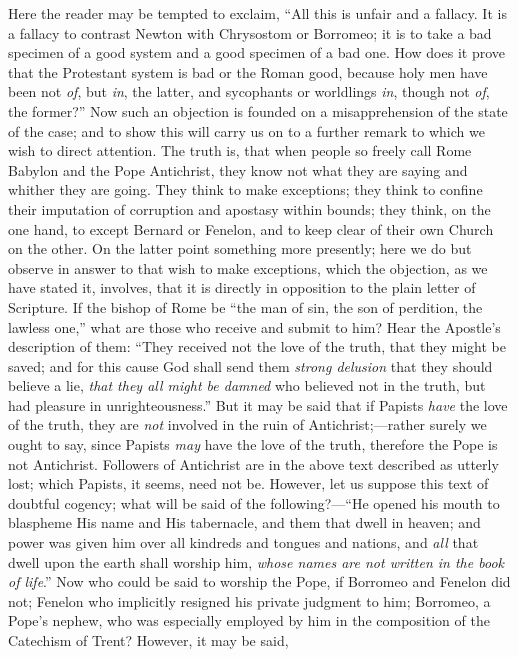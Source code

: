Here the reader may be tempted to exclaim, ``All this is unfair
and a fallacy. It is a fallacy to contrast Newton with Chrysostom or
Borromeo; it is to take a bad specimen of a good system and a good
specimen of a bad one. How does it prove that the Protestant
system is bad or the Roman good, because holy men have been not \emph{of},
but \emph{in}, the latter, and sycophants or worldlings \emph{in},
though not \emph{of}, the former?'' Now such an objection is
founded on a misapprehension of the state of the case; and to show
this will carry us on to a further remark to which we wish to direct
attention. The truth is, that when people so freely call Rome Babylon
and the Pope Antichrist, they know not what they are saying and
whither they are going. They think to make exceptions; they think to
confine their imputation of corruption and apostasy within bounds;
they think, on the one hand, to except Bernard or Fenelon, and to keep
clear of their own Church on the other. On the latter point something
more presently; here we do but observe in answer to that wish to make
exceptions, which the objection, as we have stated it, involves, that
it is directly in opposition to the plain letter of Scripture. If the
bishop of Rome be ``the man of sin, the son of perdition, the
lawless one,'' what are those who receive and submit to him? Hear
the Apostle's description of them: ``They received not the love of
the truth, that they might be saved; and for this cause God shall send
them \emph{strong delusion} that they should believe a lie, \emph{that
they all might be damned} who believed not in the truth, but had
pleasure in unrighteousness.'' But it may be said that if Papists \emph{have}
the love of the truth, they are \emph{not} involved in the ruin of
Antichrist;—rather surely we ought to say, since Papists \emph{may}
have the love of the truth, therefore the Pope is not Antichrist.
Followers of Antichrist are in the above text described as utterly
lost; which Papists, it seems, need not be. However, let us suppose
this text of doubtful cogency; what will be said of the following?—``He
opened his mouth to blaspheme His name and His tabernacle, and
them that dwell in heaven; and power was given him over all kindreds
and tongues and nations, and \emph{all} that dwell upon the earth
shall worship him, \emph{whose names are not written in the book of life}.''
Now who could be said to worship the Pope, if Borromeo and Fenelon did
not; Fenelon who implicitly resigned his private judgment to him;
Borromeo, a Pope's nephew, who was especially employed by him in the
composition of the Catechism of Trent? However, it may be said,
